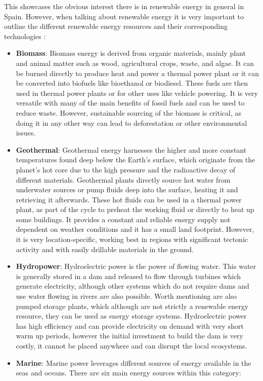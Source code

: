 This showcases the obvious interest there is in renewable energy in general in Spain. However, when talking about renewable energy it is very important to outline the different renewable energy resources and their corresponding technologies \cite{ellabban_haitham_blaabjerg_2014}:
\begin{itemize}
    \item \textbf{Biomass}: Biomass energy is derived from organic materials, mainly plant and animal matter such as wood, agricultural crops, waste, and algae. It can be burned directly to produce heat and power a thermal power plant or it can be converted into biofuels like bioethanol or biodiesel. These fuels are then used in thermal power plants or for other uses like vehicle powering. It is very versatile with many of the main benefits of fossil fuels and can be used to reduce waste. However, sustainable sourcing of the biomass is critical, as doing it in any other way can lead to deforestation or other environmental issues.
    \item \textbf{Geothermal}: Geothermal energy harnesses the higher and more constant temperatures found deep below the Earth's surface, which originate from the planet's hot core due to the high pressure and the radioactive decay of different materials. Geothermal plants directly source hot water from underwater sources or pump fluids deep into the surface, heating it and retrieving it afterwards. These hot fluids can be used in a thermal power plant, as part of the cycle to preheat the working fluid or directly to heat up some buildings. It provides a constant and reliable energy supply not dependent on weather conditions and it has a small land footprint. However, it is very location-specific, working best in regions with significant tectonic activity and with easily drillable materials in the ground. 
    \item \textbf{Hydropower}: Hydroelectric power is the power of flowing water. This water is generally stored in a dam and released to flow through turbines which generate electricity, although other systems which do not require dams and use water flowing in rivers are also possible. Worth mentioning are also pumped storage plants, which although are not strictly a renewable energy resource, they can be used as energy storage systems. Hydroelectric power has high efficiency and can provide electricity on demand with very short warm up periods, however the initial investment to build the dam is very costly, it cannot be placed anywhere and can disrupt the local ecosystems.
    \item \textbf{Marine}: Marine power leverages different sources of energy available in the seas and oceans. There are six main energy sources within this category:

\end{itemize}

